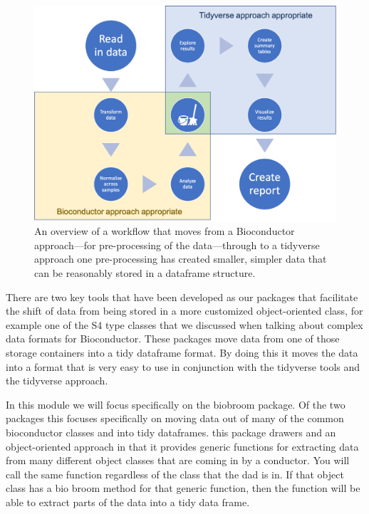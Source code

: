 \documentclass[]{tufte-book}
\begin{document}
\begin{figure}
\includegraphics[width=\textwidth]{figures/workflow} \caption[An overview of a workflow that moves from a Bioconductor approach---for pre-processing of the data---through to a tidyverse approach one pre-processing has created smaller, simpler data that can be reasonably stored in a dataframe structure]{An overview of a workflow that moves from a Bioconductor approach---for pre-processing of the data---through to a tidyverse approach one pre-processing has created smaller, simpler data that can be reasonably stored in a dataframe structure.}\label{fig:combinedworkflow}
\end{figure}

There are two key tools that have been developed as our packages that facilitate the shift of data from being stored in a more customized object-oriented class, for example one of the S4 type classes that we discussed when talking about complex data formats for Bioconductor. These packages move data from one of those storage containers into a tidy dataframe format. By doing this it moves the data into a format that is very easy to use in conjunction with the tidyverse tools and the tidyverse approach.

In this module we will focus specifically on the biobroom package. Of the two
packages this focuses specifically on moving data out of many of the common
bioconductor classes and into tidy dataframes. this package drawers and an
object-oriented approach in that it provides generic functions for extracting
data from many different object classes that are coming in by a conductor. You
will call the same function regardless of the class that the dad is in. If that
object class has a bio broom method for that generic function, then the function
will be able to extract parts of the data into a tidy data frame.
\end{document}
